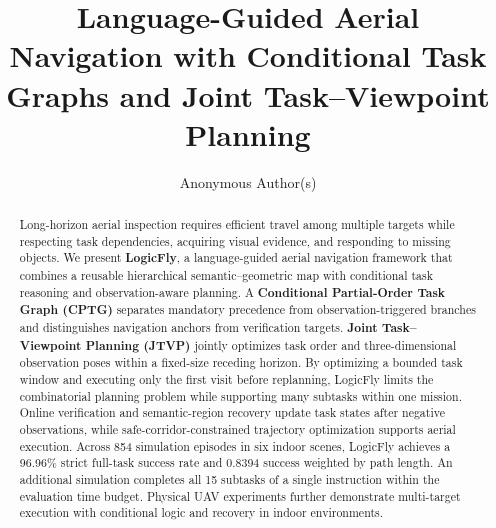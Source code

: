 \documentclass[letterpaper,10pt,journal]{IEEEtran}
\title{Language-Guided Aerial Navigation with Conditional Task Graphs and Joint Task--Viewpoint Planning}
\author{Anonymous Author(s)}
\begin{document}
\maketitle
\begin{abstract}
Long-horizon aerial inspection requires efficient travel among multiple targets while respecting task dependencies, acquiring visual evidence, and responding to missing objects. We present \textbf{LogicFly}, a language-guided aerial navigation framework that combines a reusable hierarchical semantic--geometric map with conditional task reasoning and observation-aware planning. A \textbf{Conditional Partial-Order Task Graph (CPTG)} separates mandatory precedence from observation-triggered branches and distinguishes navigation anchors from verification targets. \textbf{Joint Task--Viewpoint Planning (JTVP)} jointly optimizes task order and three-dimensional observation poses within a fixed-size receding horizon. By optimizing a bounded task window and executing only the first visit before replanning, LogicFly limits the combinatorial planning problem while supporting many subtasks within one mission. Online verification and semantic-region recovery update task states after negative observations, while safe-corridor-constrained trajectory optimization supports aerial execution. Across 854 simulation episodes in six indoor scenes, LogicFly achieves a 96.96\% strict full-task success rate and 0.8394 success weighted by path length. An additional simulation completes all 15 subtasks of a single instruction within the evaluation time budget. Physical UAV experiments further demonstrate multi-target execution with conditional logic and recovery in indoor environments.
\end{abstract}
\end{document}
